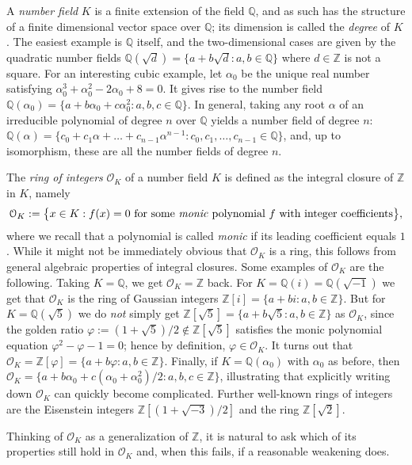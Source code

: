 \documentclass[a4paper,USenglish,cleveref, autoref, thm-restate]{lipics-v2021}
\newcommand*{\OK}[1][K]{\mathcal{O}_{#1}}
\newcommand{\Q}{\mathbb{Q}}
\newcommand{\Z}{\mathbb{Z}}
\begin{document}
A \emph{number field} $K$ is a finite extension of the field $\Q$, and as such has the structure of a finite dimensional vector space over $\Q$; its dimension is called the \emph{degree} of $K$.
The easiest example is $\Q$ itself, and the two-dimensional cases are given by the quadratic number fields
$\Q(\sqrt{d})=\{a+b\sqrt{d} : a,b \in \Q\}$
where $d \in \Z$ is not a square.
For an interesting cubic example, let $\alpha_0$ be the unique real number satisfying $\alpha_0^3 + \alpha_0^2 - 2\alpha_0 + 8=0$.
It gives rise to the number field
$\Q(\alpha_0)=\{a+b\alpha_0+c \alpha_0^2: a,b,c \in \Q\}$.
In general, taking any root $\alpha$ of an irreducible polynomial of degree $n$ over $\Q$ yields a number field of degree $n$:
$\Q(\alpha)=\{c_0+c_1\alpha+\ldots+c_{n-1} \alpha^{n-1} : c_0,c_1,\ldots,c_{n-1} \in \Q \}$,
and, up to isomorphism, these are all the number fields of degree $n$.

The \emph{ring of integers} $\OK$ of a number field $K$ is defined as the integral closure of $\Z$ in $K$, namely
\[
  \OK := \big\{x \in K : f(x)=0 \text{ for some \emph{monic} polynomial } f \text{ with integer coefficients}\big\},\]
where we recall that a polynomial is called \emph{monic} if its leading coefficient equals $1$.
While it might not be immediately obvious that $\OK$ is a ring, this follows from general algebraic properties of integral closures.
Some examples of $\OK$ are the following. Taking $K=\Q$, we get $\OK=\Z$ back.
For $K=\Q(i)=\Q(\sqrt{-1})$ we get that $\OK$ is the ring of Gaussian integers $\Z[i]=\{a+bi : a,b \in \Z\}$.
But for $K=\Q(\sqrt{5})$ we do \emph{not} simply get $\Z[\sqrt{5}]=\{a+b\sqrt{5} : a,b \in \Z\}$ as $\OK$, since the golden ratio $\varphi:=(1+\sqrt{5})/2\not\in \Z[\sqrt{5}]$ satisfies the monic polynomial equation $\varphi^2-\varphi-1=0$; hence by definition, $\varphi \in \OK$.
It turns out that $\OK=\Z[\varphi]=\{a+b\varphi : a,b \in \Z\}$.
Finally, if $K=\Q(\alpha_0)$ with $\alpha_0$ as before, then $\OK=\{a+b \alpha_0+c (\alpha_0+\alpha_0^2)/2 : a,b,c \in \Z\}$, illustrating that explicitly writing down $\OK$ can quickly become complicated.
Further well-known rings of integers are
the Eisenstein integers $\Z[(1+\sqrt{-3})/2]$ and the ring $\Z[\sqrt{2}]$.

Thinking of $\OK$ as a generalization of $\Z$, it is natural to ask which of its properties
still hold in $\OK$ and, when this fails, if a reasonable weakening does.
\end{document}
